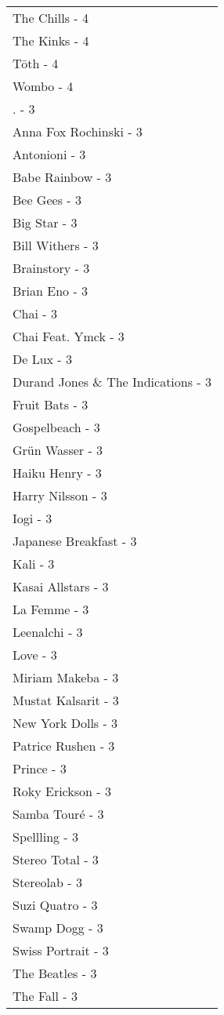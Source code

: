 \documentclass[
]{article}
\begin{document}
\begin{longtable}{l}
The Chills - 4 \\ 
The Kinks - 4 \\ 
Tōth - 4 \\ 
Wombo - 4 \\ 
. - 3 \\ 
Anna Fox Rochinski - 3 \\ 
Antonioni - 3 \\ 
Babe Rainbow - 3 \\ 
Bee Gees - 3 \\ 
Big Star - 3 \\ 
Bill Withers - 3 \\ 
Brainstory - 3 \\ 
Brian Eno - 3 \\ 
Chai - 3 \\ 
Chai Feat. Ymck - 3 \\ 
De Lux - 3 \\ 
Durand Jones \& The Indications - 3 \\ 
Fruit Bats - 3 \\ 
Gospelbeach - 3 \\ 
Grün Wasser - 3 \\ 
Haiku Henry - 3 \\ 
Harry Nilsson - 3 \\ 
Iogi - 3 \\ 
Japanese Breakfast - 3 \\ 
Kali - 3 \\ 
Kasai Allstars - 3 \\ 
La Femme - 3 \\ 
Leenalchi - 3 \\ 
Love - 3 \\ 
Miriam Makeba - 3 \\ 
Mustat Kalsarit - 3 \\ 
New York Dolls - 3 \\ 
Patrice Rushen - 3 \\ 
Prince - 3 \\ 
Roky Erickson - 3 \\ 
Samba Touré - 3 \\ 
Spellling - 3 \\ 
Stereo Total - 3 \\ 
Stereolab - 3 \\ 
Suzi Quatro - 3 \\ 
Swamp Dogg - 3 \\ 
Swiss Portrait - 3 \\ 
The Beatles - 3 \\ 
The Fall - 3 \\ 

\end{longtable}
\end{document}

